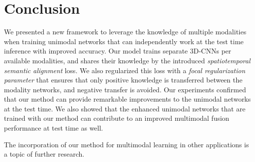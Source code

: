 \documentclass[10pt,twocolumn,letterpaper]{article}
\begin{document}
\section{Conclusion}\label{sec:conclusion}
We presented a new framework to leverage the knowledge of multiple modalities when training unimodal networks that can independently work at the test time inference with improved accuracy.   Our model trains separate 3D-CNNs per available modalities, and shares their knowledge by the introduced \emph{spatiotemporal semantic alignment} loss.  We also regularized this loss with a \emph{focal regularization parameter} that ensures that only positive knowledge is transferred between the modality networks, and negative transfer is avoided.  Our experiments confirmed that our method can provide remarkable improvements to the unimodal networks at the test time.   We also showed that the enhanced unimodal networks that are trained with our method can contribute to an improved multimodal fusion performance at  test time as well.

The incorporation of our method for multimodal learning in other applications is a topic of further research.







{\small


}
\end{document}
